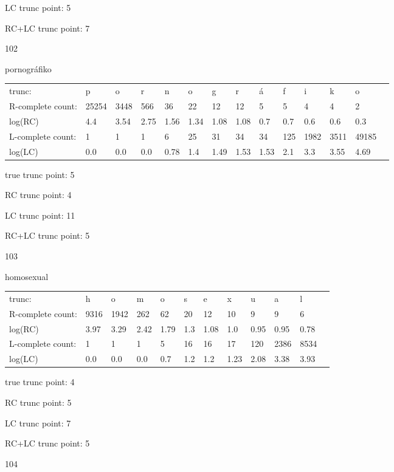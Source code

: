 \documentclass{article}
\begin{document}
LC trunc point: 5

RC+LC trunc point: 7

\vspace{1em}

102

pornográfiko

\begin{tabular}{l|lllllllllllll}
trunc: & p & o & r & n & o & g & r & á & f & i & k & o & \\ 
R-complete count: & 25254 & 3448 & 566 & 36 & 22 & 12 & 12 & 5 & 5 & 4 & 4 & 2 & \\ 
log(RC) & 4.4 & 3.54 & 2.75 & 1.56 & 1.34 & 1.08 & 1.08 & 0.7 & 0.7 & 0.6 & 0.6 & 0.3 & \\ 
L-complete count: & 1 & 1 & 1 & 6 & 25 & 31 & 34 & 34 & 125 & 1982 & 3511 & 49185 & \\ 
log(LC) & 0.0 & 0.0 & 0.0 & 0.78 & 1.4 & 1.49 & 1.53 & 1.53 & 2.1 & 3.3 & 3.55 & 4.69 & \\ 
\end{tabular}

true trunc point: 5

RC trunc point: 4

LC trunc point: 11

RC+LC trunc point: 5

\vspace{1em}

103

homosexual

\begin{tabular}{l|lllllllllll}
trunc: & h & o & m & o & s & e & x & u & a & l & \\ 
R-complete count: & 9316 & 1942 & 262 & 62 & 20 & 12 & 10 & 9 & 9 & 6 & \\ 
log(RC) & 3.97 & 3.29 & 2.42 & 1.79 & 1.3 & 1.08 & 1.0 & 0.95 & 0.95 & 0.78 & \\ 
L-complete count: & 1 & 1 & 1 & 5 & 16 & 16 & 17 & 120 & 2386 & 8534 & \\ 
log(LC) & 0.0 & 0.0 & 0.0 & 0.7 & 1.2 & 1.2 & 1.23 & 2.08 & 3.38 & 3.93 & \\ 
\end{tabular}

true trunc point: 4

RC trunc point: 5

LC trunc point: 7

RC+LC trunc point: 5

\vspace{1em}

104
\end{document}
